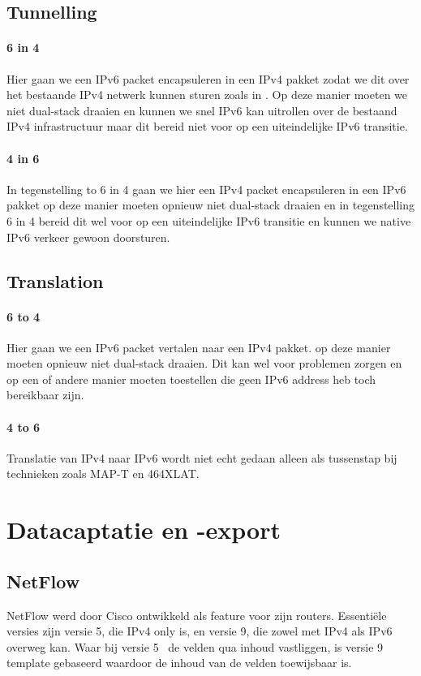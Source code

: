 \subsection{Tunnelling}
\paragraph{6 in 4}
Hier gaan we een IPv6 packet encapsuleren in een IPv4 pakket zodat we dit over het bestaande IPv4 netwerk kunnen sturen zoals in \textcite{Gilligan2005}. Op deze manier moeten we niet dual-stack draaien en kunnen we snel IPv6 kan uitrollen over de bestaand IPv4 infrastructuur maar dit bereid niet voor op een uiteindelijke IPv6 transitie.


\paragraph{4 in 6}
In tegenstelling to 6 in 4 gaan  we hier een IPv4 packet encapsuleren in een IPv6 pakket op deze manier moeten opnieuw niet dual-stack draaien en in tegenstelling 6 in 4 bereid dit wel voor op een uiteindelijke IPv6 transitie en kunnen we native IPv6 verkeer gewoon doorsturen.


\subsection{Translation}
\paragraph{6 to 4}
Hier gaan we een IPv6 packet vertalen naar een IPv4 pakket. op deze manier moeten opnieuw niet dual-stack draaien. Dit kan wel voor problemen zorgen en op een of andere manier moeten toestellen die geen IPv6 address heb toch bereikbaar zijn.

\paragraph{4 to 6}
Translatie van IPv4 naar IPv6 wordt niet echt gedaan alleen als tussenstap bij technieken zoals MAP-T en 464XLAT.

\section{Datacaptatie en -export}
\subsection{NetFlow}
NetFlow werd door Cisco ontwikkeld als feature voor zijn routers. Essentiële versies zijn versie 5, die IPv4 only is, en versie 9, die zowel met IPv4 als IPv6 overweg kan. Waar bij versie 5~\autocite{Cisco2007} de velden qua inhoud vastliggen, is versie 9~\autocite{Claise2004} template gebaseerd waardoor de inhoud van de velden toewijsbaar is.


